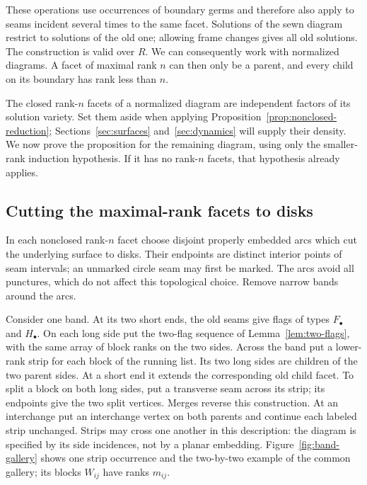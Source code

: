 These operations use occurrences of boundary germs and therefore also
apply to seams incident several times to the same facet.  Solutions
of the sewn diagram restrict to solutions of the old one; allowing
frame changes gives all old solutions.  The construction is valid
over $R$.  We can consequently work with normalized diagrams.
A facet of maximal rank $n$ can then only be a parent, and
every child on its boundary has rank less than $n$.

The closed rank-$n$ facets of a normalized diagram are independent
factors of its solution variety.  Set them aside when applying
Proposition~\ref{prop:nonclosed-reduction}; Sections~\ref{sec:surfaces}
and~\ref{sec:dynamics} will supply their density.  We now prove the
proposition for the remaining diagram, using only the smaller-rank
induction hypothesis.  If it has no rank-$n$ facets, that hypothesis
already applies.

\subsection{Cutting the maximal-rank facets to disks}

In each nonclosed rank-$n$ facet choose disjoint properly embedded
arcs which cut the underlying surface to disks.  Their endpoints are
distinct interior points of seam intervals; an unmarked circle seam
may first be marked.  The arcs avoid all punctures, which do not
affect this topological choice.  Remove narrow bands around the arcs.

Consider one band.  At its two short ends, the old seams give flags
of types $F_\bullet$ and $H_\bullet$.  On each long side put the
two-flag sequence of Lemma~\ref{lem:two-flags}, with the same array
of block ranks on the two sides.  Across the band put a lower-rank
strip for each block of the running list.  Its two long sides are
children of the two parent sides.  At a short end it extends the
corresponding old child facet.  To split a block on both long sides,
put a transverse seam across its strip; its endpoints give the two
split vertices.  Merges reverse this construction.  At an
interchange put an interchange vertex on both parents and continue
each labeled strip unchanged.  Strips may cross one another in this
description: the diagram is specified by its side incidences, not
by a planar embedding.
Figure~\ref{fig:band-gallery} shows one strip occurrence and the
two-by-two example of the common gallery; its blocks $W_{ij}$ have
ranks $m_{ij}$.

